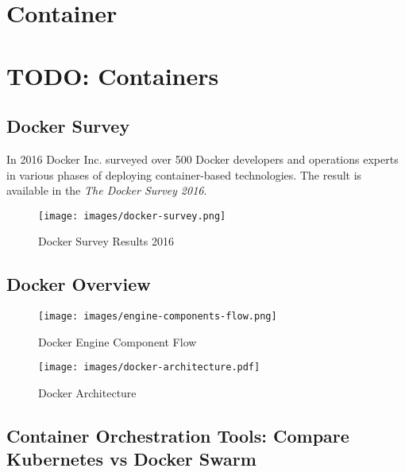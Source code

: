 \chapter{Container}

\FILENAME

\chapter{TODO: Containers}\label{pi-cluster-form-factor}

\section{Docker Survey}

In 2016 Docker Inc. surveyed over 500 Docker developers and operations
experts in various phases of deploying container-based
technologies. The result is available in the \textit{The Docker Survey
  2016}.


\begin{figure}[htb]
\centering
\texttt{[image: images/docker-survey.png]}
\caption{Docker Survey Results 2016
}
\end{figure}


\section{Docker Overview}



\begin{figure}[htb]
\centering
\texttt{[image: images/engine-components-flow.png]}
\caption{ Docker Engine Component Flow }
\end{figure}

\begin{figure}[htb]
\centering
\texttt{[image: images/docker-architecture.pdf]}
\caption{ Docker Architecture }
\end{figure}



\section{Container Orchestration Tools: Compare Kubernetes vs Docker Swarm}


